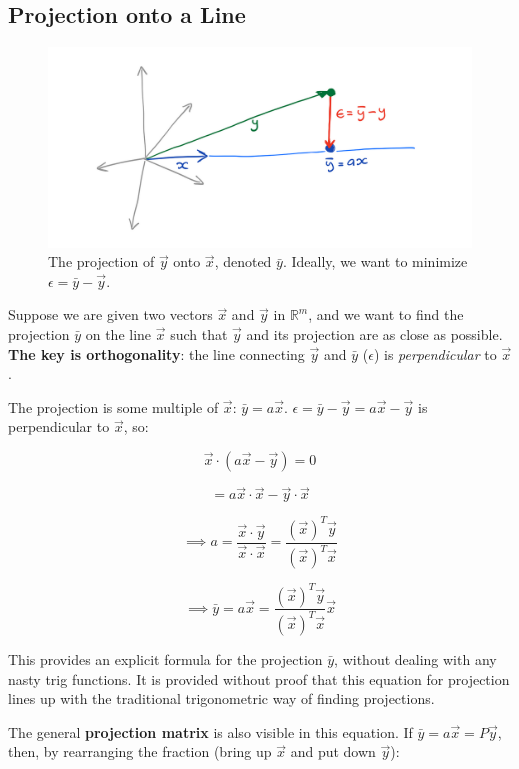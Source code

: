 \documentclass{article}
\begin{document}
\subsection{Projection onto a Line}
\begin{figure}[htbp]
    \center
    \includegraphics[scale=0.2]{projection.png}
    \caption{The projection of $\vec{y}$ onto $\vec{x}$, denoted $\bar{y}$. Ideally, we want to minimize $\epsilon = \bar{y} - \vec{y}$.}
\end{figure}

Suppose we are given two vectors $\vec{x}$ and $\vec{y}$ in $\mathbb{R}^m$, and we want to find the projection $\bar{y}$ on the line $\vec{x}$ such that $\vec{y}$ and its projection are as close as possible.
\textbf{The key is orthogonality}: the line connecting $\vec{y}$ and $\bar{y}$ ($\epsilon$) is \textit{perpendicular} to $\vec{x}$.

The projection is some multiple of $\vec{x}$: $\bar{y} = a \vec{x}$.
$\epsilon = \bar{y} - \vec{y} = a \vec{x} - \vec{y}$ is perpendicular to $\vec{x}$, so:

\[\vec{x} \cdot (a \vec{x} - \vec{y}) = 0\]

\[= a \vec{x} \cdot \vec{x} - \vec{y} \cdot \vec{x}\]

\[\implies a = \frac{\vec{x} \cdot \vec{y}}{\vec{x} \cdot \vec{x}} = \frac{(\vec{x})^T \vec{y}}{(\vec{x})^T \vec{x}}\]

\[\implies \bar{y} = a \vec{x} = \frac{(\vec{x})^T \vec{y}}{(\vec{x})^T \vec{x}} \vec{x}\]

This provides an explicit formula for the projection $\bar{y}$, without dealing with any nasty trig functions.
It is provided without proof that this equation for projection lines up with the traditional trigonometric way of finding projections.

The general \textbf{projection matrix} is also visible in this equation.
If $\bar{y} = a \vec{x} = P \vec{y}$, then, by rearranging the fraction (bring up $\vec{x}$ and put down $\vec{y}$):
\end{document}
